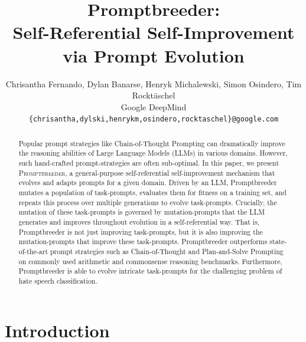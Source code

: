 \documentclass{article} %
\title{Promptbreeder:\\Self-Referential Self-Improvement\\ via Prompt Evolution}
\author{Chrisantha Fernando, Dylan Banarse, Henryk Michalewski, Simon Osindero, Tim Rocktäschel\\
Google DeepMind\\
\texttt{\{chrisantha,dylski,henrykm,osindero,rocktaschel\}@google.com}
}
\begin{document}
\maketitle
\thispagestyle{firstpage}
\vspace{-1em}

\begin{abstract}
Popular prompt strategies like Chain-of-Thought Prompting can dramatically improve the reasoning abilities of Large Language Models (LLMs) in various domains. However, such hand-crafted prompt-strategies are often sub-optimal. In this paper, we present \textsc{Promptbreeder}, a general-purpose self-referential self-improvement mechanism that evolves and adapts prompts for a given domain. Driven by an LLM, Promptbreeder mutates a population of task-prompts, evaluates them for fitness on a training set, and repeats this process over multiple generations to evolve task-prompts. Crucially, the mutation of these task-prompts is governed by mutation-prompts that the LLM generates and improves throughout evolution in a self-referential way. That is, Promptbreeder is not just improving task-prompts, but it is also improving the mutation-prompts that improve these task-prompts. Promptbreeder outperforms state-of-the-art prompt strategies such as Chain-of-Thought and Plan-and-Solve Prompting on commonly used arithmetic and commonsense reasoning benchmarks. Furthermore, Promptbreeder is able to evolve intricate task-prompts for the challenging problem of hate speech classification.
\end{abstract}



\section{Introduction}
\end{document}
